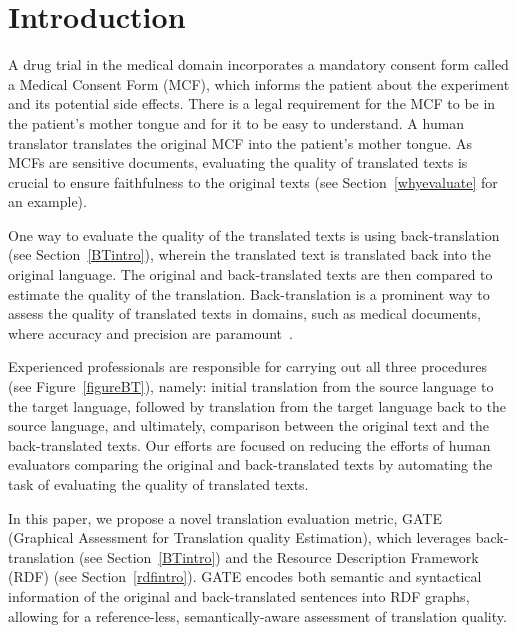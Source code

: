 \documentclass[runningheads]{llncs}
\begin{document}
\section{Introduction} 

A drug trial in the medical domain incorporates a mandatory consent form called a Medical Consent Form (MCF), which informs the patient about the experiment and its potential side effects. There is a legal requirement for the MCF to be in the patient’s mother tongue and for it to be easy to understand. A human translator translates the original MCF into the patient's mother tongue. As MCFs are sensitive documents, evaluating the quality of translated texts is crucial to ensure faithfulness to the original texts (see Section~\ref{whyevaluate} for an example). 

One way to evaluate the quality of the translated texts is using back-translation (see Section~\ref{BTintro}), wherein the translated text is translated back into the original language. The original and back-translated texts are then compared to estimate the quality of the translation. Back-translation is a prominent way to assess the quality of translated texts in domains, such as medical documents, where accuracy and precision are paramount~\cite{whyBT}\cite{whyBTMedical}.

Experienced professionals are responsible for carrying out all three procedures (see Figure~\ref{figureBT}), namely: initial translation from the source language to the target language, followed by translation from the target language back to the source language, and ultimately, comparison between the original text and the back-translated texts. Our efforts are focused on reducing the efforts of human evaluators comparing the original and back-translated texts by automating the task of evaluating the quality of translated texts.

In this paper, we propose a novel translation evaluation metric, GATE (Graphical Assessment for Translation quality Estimation), which leverages back-translation (see Section~\ref{BTintro}) and the Resource Description Framework (RDF) (see Section~\ref{rdfintro}). GATE encodes both semantic and syntactical information of the original and back-translated sentences into RDF graphs, allowing for a reference-less, semantically-aware assessment of translation quality.
\end{document}
